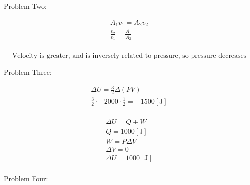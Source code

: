 \documentclass[12pt]{article}
\begin{document}
\begin{center}
  Problem Two:
\end{center}
    \hline
    
    \begin{equation}
      \begin{split}
        A_1v_1=A_2v_2\\
        \frac{v_2}{v_1}=\frac{A_1}{A_2}\\
      \end{split}
      \label{5}
    \end{equation}

    \begin{equation}
      \begin{split}
        \text{Velocity is greater, and is inversely related to pressure, so pressure decreases}
      \end{split}
      \label{6}
    \end{equation}

    \hline

    \newpage

\begin{center}
  Problem Three:
\end{center}

\hline

\begin{equation}
  \begin{split}
    \Delta U=\frac{3}{2}\Delta(PV)\\
    \frac{3}{2}\cdot-2000\cdot\frac{1}{2}=-1500[\si{\joule}]\\
  \end{split}
  \label{7}
\end{equation}

\begin{equation}
  \begin{split}
    \Delta U=Q+W\\
    Q=1000[\si{\joule}]\\
    W=P\Delta V\\
    \Delta V=0\\
    \Delta U = 1000[\si{\joule}]\\
  \end{split}
  \label{8}
\end{equation}

\hline

\newpage

\begin{center}
  Problem Four:
\end{center}
\end{document}
